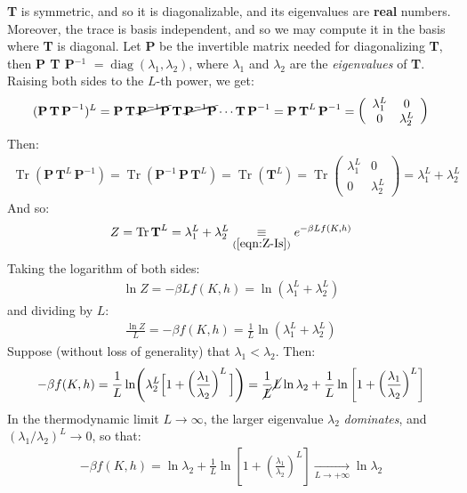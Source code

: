 \documentclass[../template.tex]{subfiles}
\begin{document}
\medskip

\textbf{T} is symmetric, and so it is diagonalizable, and its eigenvalues are \textbf{real} numbers. Moreover, the trace is basis independent, and so we may compute it in the basis where \textbf{T} is diagonal. Let \textbf{P} be the invertible matrix needed for diagonalizing \textbf{T}, then \textbf{P T P$^{-1}$} $= \operatorname{diag}(\lambda_1, \lambda_2)$, where $\lambda_1$ and $\lambda_2$ are the \textit{eigenvalues} of \textbf{T}. Raising both sides to the $L$-th power, we get:
\begin{align*}
    (\textbf{P}\, \textbf{T}\,\textbf{P}^{-1})^L  = \textbf{P}\,\textbf{T}\,\cancel{\textbf{P}^{-1} \textbf{P}}\,\textbf{T}\,\cancel{\textbf{P}^{-1} \textbf{P}}\cdots \textbf{T}\, \textbf{P}^{-1} = \textbf{P}\,\textbf{T}^L\, \textbf{P}^{-1} = \left(\begin{array}{cc}
    \lambda_1^L & 0 \\ 
    0 & \lambda_2^L
    \end{array}\right)           
\end{align*} 
Then:
\begin{align*}
    \operatorname{Tr}(\textbf{P}\,\textbf{T}^L\,\textbf{P}^{-1}) = \operatorname{Tr}(\textbf{P}^{-1}\,\textbf{P}\,\textbf{T}^L) = \operatorname{Tr}(\textbf{T}^L) =\operatorname{Tr} \left(\begin{array}{cc}
    \lambda_1^L & 0 \\ 
    0 & \lambda_2^L
    \end{array}\right) = \lambda_1^L + \lambda_2^L
\end{align*}
And so:
\begin{align*}
    Z = \operatorname{Tr} \textbf{T}^L = \lambda_1^L + \lambda_2^L  \underset{(\ref{eqn:Z-Is})}{\equiv}  e^{-\beta L f(K,h)}
\end{align*}
Taking the logarithm of both sides:
\begin{align*}
    \ln Z = - \beta L f(K,h) = \ln (\lambda_1^L + \lambda_2^L)
\end{align*}
and dividing by $L$:
\begin{align*}
    \frac{\ln Z}{L} = - \beta f(K,h) = \frac{1}{L} \ln(\lambda_1^L + \lambda_2^L)  
\end{align*}
Suppose (without loss of generality) that $\lambda_1 < \lambda_2$. Then:
\begin{align*}
    -\beta f(K,h) = \frac{1}{L} \ln(\lambda_2^L \Big[1+\left(\frac{\lambda_1}{\lambda_2}\right)^L \Big]) = \frac{1}{\cancel{L}} \cancel{L} \ln \lambda_2 + \frac{1}{L} \ln \left[1+\left(\frac{\lambda_1}{\lambda_2}\right)^L \right]  
\end{align*}
In the thermodynamic limit $L \to \infty$, the larger eigenvalue $\lambda_2$ \textit{dominates}, and $(\lambda_1/\lambda_2)^L \to 0$, so that:
\begin{align}\label{eqn:f-limit}
    -\beta f(K,h) = \ln \lambda_2 + \frac{1}{L} \ln \left[1+\left(\frac{\lambda_1}{\lambda_2}\right)^L \right] \xrightarrow[L \to +\infty]{} \ln \lambda_2
\end{align} 
\end{document}
